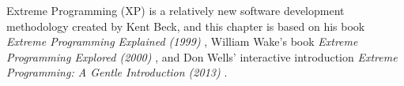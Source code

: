 Extreme Programming (XP) is a relatively new software development methodology created by Kent Beck, and this chapter is based on his book \textit{Extreme Programming Explained (1999)} \citep{xp:explained}, William Wake's book \textit{Extreme Programming Explored (2000)} \citep{xp:explored}, and Don Wells' interactive introduction \textit{Extreme Programming: A Gentle Introduction (2013)} \citep{xp:online}.
